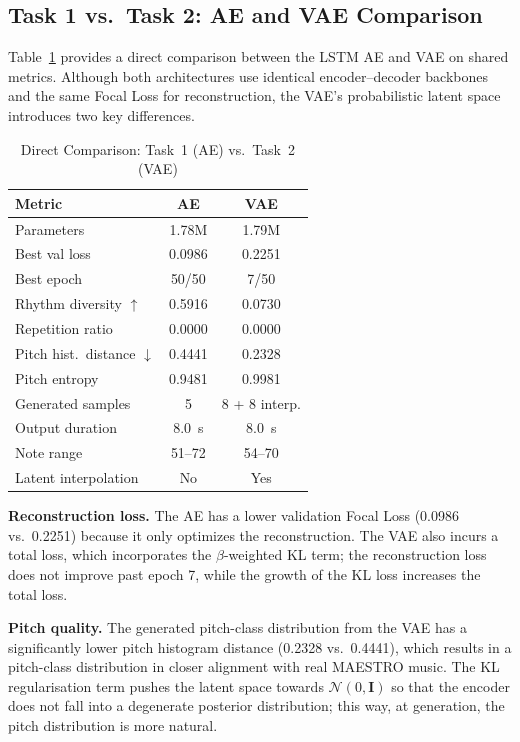\documentclass[conference]{IEEEtran}
\begin{document}
\subsection{Task 1 vs.\ Task 2: AE and VAE Comparison}

Table~\ref{tab:ae_vae} provides a direct comparison between the LSTM AE and VAE on shared metrics. Although both architectures use identical encoder–decoder backbones and the same Focal Loss for reconstruction, the VAE's probabilistic latent space introduces two key differences.

\begin{table}[t]
\caption{Direct Comparison: Task~1 (AE) vs.\ Task~2 (VAE)}
\label{tab:ae_vae}
\begin{center}
\begin{tabular}{l c c}
\toprule
\textbf{Metric} & \textbf{AE} & \textbf{VAE} \\
\midrule
Parameters            & 1.78M  & 1.79M  \\
Best val loss         & 0.0986 & 0.2251 \\
Best epoch            & 50/50  & 7/50   \\
Rhythm diversity $\uparrow$     & 0.5916 & 0.0730 \\
Repetition ratio      & 0.0000 & 0.0000 \\
Pitch hist.\ distance $\downarrow$ & 0.4441 & 0.2328 \\
Pitch entropy         & 0.9481 & 0.9981 \\
Generated samples     & 5      & 8 + 8 interp. \\
Output duration       & 8.0~s  & 8.0~s  \\
Note range            & 51--72 & 54--70 \\
Latent interpolation  & No     & Yes    \\
\bottomrule
\end{tabular}
\end{center}
\end{table}

\textbf{Reconstruction loss.} The AE has a lower validation Focal Loss (0.0986 vs.\ 0.2251) because it only optimizes the reconstruction. The VAE also incurs a total loss, which incorporates the $\beta$-weighted KL term; the reconstruction loss does not improve past epoch 7, while the growth of the KL loss increases the total loss.

\textbf{Pitch quality.} The generated pitch-class distribution from the VAE has a significantly lower pitch histogram distance (0.2328 vs.\ 0.4441), which results in a pitch-class distribution in closer alignment with real MAESTRO music. The KL regularisation term pushes the latent space towards $\mathcal{N}(0,\mathbf{I})$ so that the encoder does not fall into a degenerate posterior distribution; this way, at generation, the pitch distribution is more natural.
\end{document}
